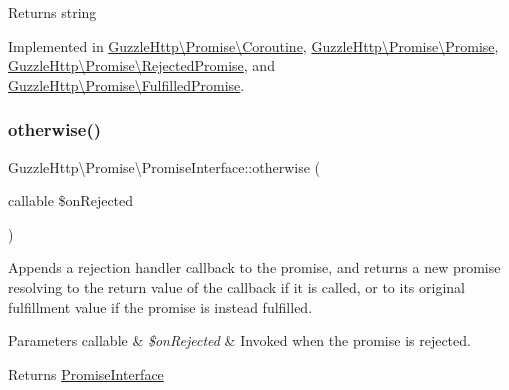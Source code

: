 \begin{DoxyReturn}{Returns}
string 
\end{DoxyReturn}


Implemented in \hyperlink{classGuzzleHttp_1_1Promise_1_1Coroutine_a67968b964dd78cde69e69267f2f6bc8e}{Guzzle\+Http\textbackslash{}\+Promise\textbackslash{}\+Coroutine}, \hyperlink{classGuzzleHttp_1_1Promise_1_1Promise_a598a43e196fc3fd6445a9ca5e5b974f3}{Guzzle\+Http\textbackslash{}\+Promise\textbackslash{}\+Promise}, \hyperlink{classGuzzleHttp_1_1Promise_1_1RejectedPromise_a335b97e19692bbbba3718d892d335dd9}{Guzzle\+Http\textbackslash{}\+Promise\textbackslash{}\+Rejected\+Promise}, and \hyperlink{classGuzzleHttp_1_1Promise_1_1FulfilledPromise_a573e5b00f2e5a280190d101a128a4748}{Guzzle\+Http\textbackslash{}\+Promise\textbackslash{}\+Fulfilled\+Promise}.

\mbox{\label{interfaceGuzzleHttp_1_1Promise_1_1PromiseInterface_a4a7334842850943b3dd2fdd8ec23943b}} 
\subsubsection{\texorpdfstring{otherwise()}{otherwise()}}
{\footnotesize\ttfamily Guzzle\+Http\textbackslash{}\+Promise\textbackslash{}\+Promise\+Interface\+::otherwise (\begin{DoxyParamCaption}\item[{callable}]{\$on\+Rejected }\end{DoxyParamCaption})}

Appends a rejection handler callback to the promise, and returns a new promise resolving to the return value of the callback if it is called, or to its original fulfillment value if the promise is instead fulfilled.


\begin{DoxyParams}[1]{Parameters}
callable & {\em \$on\+Rejected} & Invoked when the promise is rejected.\\
\hline
\end{DoxyParams}
\begin{DoxyReturn}{Returns}
\hyperlink{interfaceGuzzleHttp_1_1Promise_1_1PromiseInterface}{Promise\+Interface} 
\end{DoxyReturn}


